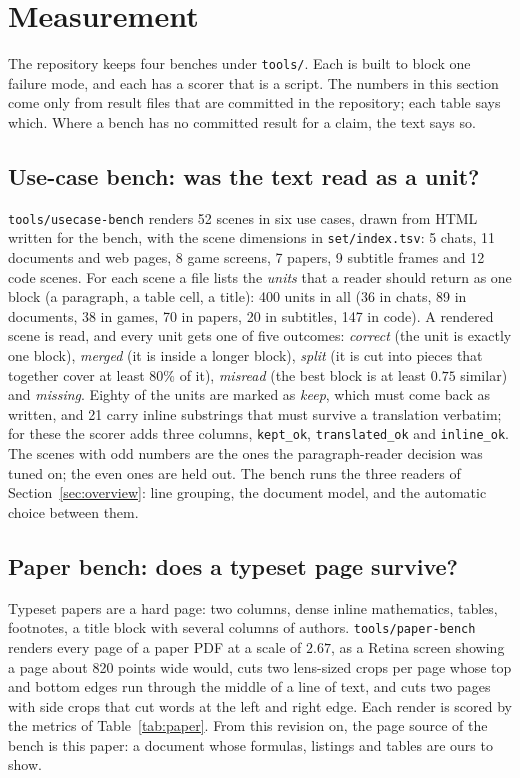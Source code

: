 \section{Measurement}\label{sec:measure}

The repository keeps four benches under \texttt{tools/}. Each is built to block one failure mode, and each has a scorer that is a
script. The numbers in this section come only from result files that are committed in the repository; each table says which. Where
a bench has no committed result for a claim, the text says so.

\subsection{Use-case bench: was the text read as a unit?}

\texttt{tools/usecase-bench} renders 52 scenes in six use cases, drawn from HTML written for the bench, with the scene
dimensions in \texttt{set/index.tsv}: 5 chats, 11 documents and web pages, 8 game screens, 7 papers, 9 subtitle frames and 12 code
scenes. For each scene a file lists the \emph{units} that a reader should return as one block (a paragraph, a table cell, a
title): 400 units in all (36 in chats, 89 in documents, 38 in games, 70 in papers, 20 in subtitles, 147 in code). A rendered scene is read, and
every unit gets one of five outcomes:
\emph{correct} (the unit is exactly one block), \emph{merged} (it is inside a longer block), \emph{split} (it is cut into pieces that
together cover at least $80\%$ of it), \emph{misread} (the best block is at least $0.75$ similar) and \emph{missing}. Eighty of the units are marked
as \emph{keep}, which must come back as written, and 21 carry inline substrings that must survive a translation verbatim; for these the scorer adds
three columns, \texttt{kept\_ok}, \texttt{translated\_ok} and \texttt{inline\_ok}. The scenes with odd numbers are the ones the paragraph-reader decision was tuned
on; the even ones are held out. The bench runs the three readers of Section~\ref{sec:overview}: line grouping, the document model, and the
automatic choice between them.

\subsection{Paper bench: does a typeset page survive?}

Typeset papers are a hard page: two columns, dense inline mathematics, tables, footnotes, a title block
with several columns of authors. \texttt{tools/paper-bench} renders every page of a paper PDF at a scale of $2.67$, as a Retina
screen showing a page about 820 points wide would, cuts two lens-sized crops per page whose top and bottom edges run through the middle of a line of text, and
cuts two pages with side crops that cut words at the left and right edge. Each render is scored by the metrics of
Table~\ref{tab:paper}. From this revision on, the page source of the bench is this paper: a document whose formulas, listings and tables
are ours to show.

